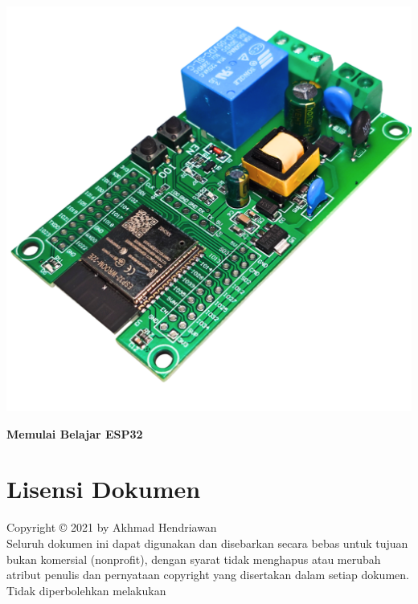 \documentclass[a4paper,12pt]{article}
\begin{document}
     \begin{titlepage}
         \centering
         \includegraphics[width=\textwidth]{gambar.png}\par
         \vspace{1cm}
         {\Huge\bfseries Memulai Belajar ESP32\par}
         \vfill
     \end{titlepage}

     \newpage
     \section*{Lisensi Dokumen}
     \noindent
     Copyright © 2021 by Akhmad Hendriawan\\
     Seluruh dokumen ini dapat digunakan dan disebarkan secara bebas untuk tujuan bukan
     komersial (nonprofit), dengan syarat tidak menghapus atau merubah atribut penulis dan
     pernyataan copyright yang disertakan dalam setiap dokumen. Tidak diperbolehkan melakukan

     \newpage
     \tableofcontents

     \newpage
     \listoffigures

     \newpage
     
\end{document}
